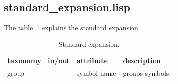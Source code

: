 \documentclass[a4paper, 12pt, openany]{scrbook}
\begin{document}
\subsection{standard\_expansion.lisp}
The table~\ref{tab:standard-expansion} explains the standard expansion.
\begin{table}[htbp]
\centering
\begin{tabular}{|p{3.5cm}|p{3.5cm}|p{3.5cm}|p{5cm}|}
  \hline
  \textbf{taxonomy} & \textbf{in/out} & \textbf{attribute} & \textbf{description} \\
  \hline
  group & - & symbol name & groups symbols. \\
  \hline
\end{tabular}
\caption{Standard expansion.}
\label{tab:standard-expansion}
\end{table}

\end{document}
